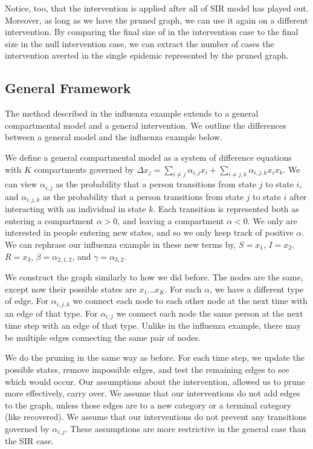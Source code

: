 \documentclass[openacc]{rsproca_new}%
\begin{document}
Notice, too, that the intervention is applied after all of SIR model has played out.
Moreover, as long as we have the pruned graph, we can use it again on a different intervention.
By comparing the final size of in the intervention case to the final size in the null intervention case, we can extract the number of cases the intervention averted in the single epidemic represented by the pruned graph.

\subsection{General Framework}


The method described in the influenza example extends to a general compartmental model and a general intervention.
We outline the differences between a general model and the influenza example below.


We define a general compartmental model as a system of difference equations with $K$ compartments governed by \(\Delta x_{j} = \sum_{i \neq j} \alpha_{i,j}x_i + \sum_{i \neq j, k} \alpha_{i,j,k} x_ix_k\).
We can view $\alpha_{i,j}$ as the probability that a person transitions from state $j$ to state $i$, and $\alpha_{i,j,k}$ as the probability that a person transitions from state $j$ to state $i$ after interacting with an individual in state $k$.
Each transition is represented both as entering a compartment $\alpha > 0$, and leaving a compartment $\alpha < 0$.
We only are interested in people entering new states, and so we only keep track of positive $\alpha$.
We can rephrase our influenza example in these new terms by, $S=x_1$, $I=x_2$, $R=x_3$, $\beta = \alpha_{2,1,2}$, and $\gamma = \alpha_{3,2}$.

We construct the graph similarly to how we did before.
The nodes are the same, except now their possible states are $x_1 \dots x_K$.
For each $\alpha$, we have a different type of edge.
For $\alpha_{i,j,k}$ we connect each node to each other node at the next time with an edge of that type.
For $\alpha_{i,j}$ we connect each node the same person at the next time step with an edge of that type.
Unlike in the influenza example, there may be multiple edges connecting the same pair of nodes.

We do the pruning in the same way as before.
For each time step, we update the possible states, remove impossible edges, and test the remaining edges to see which would occur.
Our assumptions about the intervention, allowed us to prune more effectively, carry over.
We assume that our interventions do not add edges to the graph, unless those edges are to a new category or a terminal category (like recovered).
We assume that our interventions do not prevent any transitions governed by $\alpha_{i,j}$.
These assumptions are more restrictive in the general case than the SIR case.
\end{document}
